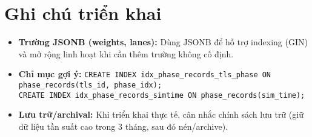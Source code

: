\section*{Ghi chú triển khai}
\begin{itemize}
  \item \textbf{Trường JSONB (weights, lanes):} Dùng JSONB để hỗ trợ indexing (GIN) và mở rộng linh hoạt khi cần thêm trường không cố định.
  \item \textbf{Chỉ mục gợi ý:} \texttt{CREATE INDEX idx\_phase\_records\_tls\_phase ON phase\_records(tls\_id, phase\_idx);} \\
    \texttt{CREATE INDEX idx\_phase\_records\_simtime ON phase\_records(sim\_time);}
  \item \textbf{Lưu trữ/archival:} Khi triển khai thực tế, cân nhắc chính sách lưu trữ (giữ dữ liệu tần suất cao trong 3 tháng, sau đó nén/archive).
\end{itemize}
